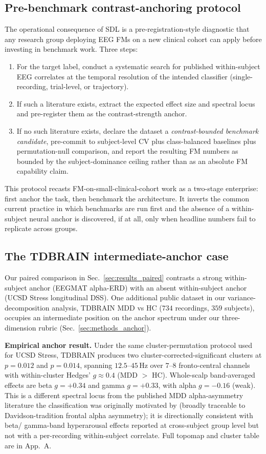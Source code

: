 \subsection{Pre-benchmark contrast-anchoring protocol}
The operational consequence of SDL is a pre-registration-style
diagnostic that any research group deploying EEG FMs on a new
clinical cohort can apply before investing in benchmark work. Three
steps:
\begin{enumerate}
  \item For the target label, conduct a systematic search for
    published within-subject EEG correlates at the temporal
    resolution of the intended classifier (single-recording,
    trial-level, or trajectory).
  \item If such a literature exists, extract the expected effect size
    and spectral locus and pre-register them as the contrast-strength
    anchor.
  \item If no such literature exists, declare the dataset a
    \emph{contrast-bounded benchmark candidate}, pre-commit to
    subject-level CV plus class-balanced baselines plus
    permutation-null comparison, and report the resulting FM numbers
    as bounded by the subject-dominance ceiling rather than as an
    absolute FM capability claim.
\end{enumerate}
This protocol recasts FM-on-small-clinical-cohort work as a two-stage
enterprise: first anchor the task, then benchmark the architecture.
It inverts the common current practice in which benchmarks are run
first and the absence of a within-subject neural anchor is
discovered, if at all, only when headline numbers fail to replicate
across groups.

\subsection{The TDBRAIN intermediate-anchor case}
\label{sec:discussion_intermediate}
Our paired comparison in Sec.~\ref{sec:results_paired} contrasts a
strong within-subject anchor (EEGMAT alpha-ERD) with an absent
within-subject anchor (UCSD Stress longitudinal DSS). One additional
public dataset in our variance-decomposition analysis,
TDBRAIN \citep{tdbrain} MDD vs HC ($734$ recordings,
$359$ subjects), occupies an intermediate position on the anchor
spectrum under our three-dimension rubric
(Sec.~\ref{sec:methods_anchor}).

\textbf{Empirical anchor result.} Under the same cluster-permutation
protocol used for UCSD Stress, TDBRAIN produces two
cluster-corrected-significant clusters at $p = 0.012$ and $p = 0.014$,
spanning $12.5$--$45$\,Hz over $7$--$8$ fronto-central channels with
within-cluster Hedges' $g \approx 0.4$ (MDD $>$ HC). Whole-scalp
band-averaged effects are beta $g = +0.34$ and gamma $g = +0.33$, with
alpha $g = -0.16$ (weak). This is a different spectral locus from the
published MDD alpha-asymmetry literature the classification was
originally motivated by (broadly traceable to Davidson-tradition
frontal alpha asymmetry); it is directionally consistent with beta/
gamma-band hyperarousal effects reported at cross-subject group level
\citep{olbrich2013mddarousal} but not with a per-recording
within-subject correlate. Full topomap and cluster table are in
App.~A.

